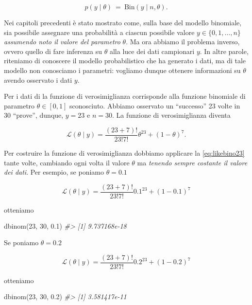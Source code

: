 \documentclass[
]{book}
\newenvironment{Shaded}{\begin{snugshade}}{\end{snugshade}}
\newcommand{\CommentTok}[1]{\textcolor[rgb]{0.56,0.35,0.01}{\textit{#1}}}
\newcommand{\DecValTok}[1]{\textcolor[rgb]{0.00,0.00,0.81}{#1}}
\newcommand{\FloatTok}[1]{\textcolor[rgb]{0.00,0.00,0.81}{#1}}
\newcommand{\FunctionTok}[1]{\textcolor[rgb]{0.00,0.00,0.00}{#1}}
\newcommand{\NormalTok}[1]{#1}
\theoremstyle{definition}
\theoremstyle{definition}
\theoremstyle{definition}
\theoremstyle{definition}
\theoremstyle{remark}
\begin{document}
\[
p(y \mid \theta)
\ = \
\mbox{Bin}(y \mid n, \theta).
\]

Nei capitoli precedenti è stato mostrato come, sulla base del modello binomiale, sia possibile assegnare una probabilità a ciascun possibile valore \(y \in \{0, 1, \dots, n\}\) \emph{assumendo noto il valore del parametro} \(\theta\). Ma ora abbiamo il problema inverso, ovvero quello di fare inferenza su \(\theta\) alla luce dei dati campionari \(y\). In altre parole, riteniamo di conoscere il modello probabilistico che ha generato i dati, ma di tale modello non conosciamo i parametri: vogliamo dunque ottenere informazioni su \(\theta\) avendo osservato i dati \(y\).

Per i dati di \citet{zetschefuture2019} la funzione di verosimiglianza corrisponde alla funzione binomiale di parametro \(\theta \in [0, 1]\) sconosciuto. Abbiamo osservato un ``successo'' 23 volte in 30 ``prove'', dunque, \(y = 23\) e \(n = 30\). La funzione di verosimiglianza diventa

\begin{equation}
\mathcal{L}(\theta \mid y) = \frac{(23 + 7)!}{23!7!} \theta^{23} + (1-\theta)^7.
\label{eq:likebino23}
\end{equation}

Per costruire la funzione di verosimiglianza dobbiamo applicare la \eqref{eq:likebino23} tante volte, cambiando ogni volta il valore \(\theta\) ma \emph{tenendo sempre costante il valore dei dati}. Per esempio, se poniamo \(\theta = 0.1\)

\[
\mathcal{L}(\theta \mid y) = \frac{(23 + 7)!}{23!7!} 0.1^{23} + (1-0.1)^7
\]

otteniamo

\begin{Shaded}
\begin{Highlighting}[]
\FunctionTok{dbinom}\NormalTok{(}\DecValTok{23}\NormalTok{, }\DecValTok{30}\NormalTok{, }\FloatTok{0.1}\NormalTok{)}
\CommentTok{\#\textgreater{} [1] 9.737168e{-}18}
\end{Highlighting}
\end{Shaded}

Se poniamo \(\theta = 0.2\)

\[
\mathcal{L}(\theta \mid y) = \frac{(23 + 7)!}{23!7!} 0.2^{23} + (1-0.2)^7
\]

otteniamo

\begin{Shaded}
\begin{Highlighting}[]
\FunctionTok{dbinom}\NormalTok{(}\DecValTok{23}\NormalTok{, }\DecValTok{30}\NormalTok{, }\FloatTok{0.2}\NormalTok{)}
\CommentTok{\#\textgreater{} [1] 3.581417e{-}11}
\end{Highlighting}
\end{Shaded}
\end{document}
